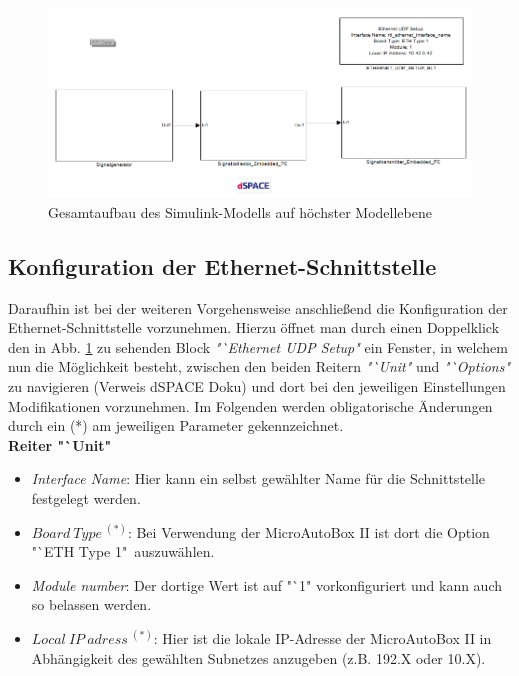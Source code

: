 \documentclass[fontsize = 12pt, paper = a4]{scrreprt}
\begin{document}
\begin{figure}[h]
\centering
\includegraphics[scale = 0.65]{topmodell}
\caption[Gesamtaufbau Simulink-Modell]{Gesamtaufbau des Simulink-Modells auf höchster Modellebene}
\label{topmodell}
\end{figure} 

\newpage


\subsection{Konfiguration der Ethernet-Schnittstelle}

Daraufhin ist bei der weiteren Vorgehensweise anschließend die Konfiguration der Ethernet-Schnittstelle vorzunehmen. Hierzu öffnet man durch einen Doppelklick den in Abb. \ref{topmodell} zu sehenden Block \textit{"`Ethernet UDP Setup"} ein Fenster, in welchem nun die Möglichkeit besteht, zwischen den beiden Reitern \textit{"`Unit"} und \textit{"`Options"} zu navigieren (Verweis dSPACE Doku) und dort bei den jeweiligen Einstellungen Modifikationen vorzunehmen. Im Folgenden werden obligatorische Änderungen durch ein (*) am jeweiligen Parameter gekennzeichnet. \\

\textbf{Reiter "`Unit"} 

\begin{itemize}

\item \textit{Interface Name}: Hier kann ein selbst gewählter Name für die Schnittstelle festgelegt werden.

\item \textit{$Board \ Type \ ^{(*)}$}: Bei Verwendung der MicroAutoBox II ist dort die Option \\ "`ETH Type 1"\ auszuwählen.

\item \textit{Module number}: Der dortige Wert ist auf "`1" vorkonfiguriert und kann auch so belassen werden.

\item \textit{$Local \ IP \ adress \ ^{(*)}$}: Hier ist die lokale IP-Adresse der MicroAutoBox II in Abhängigkeit des gewählten Subnetzes  anzugeben (z.B. 192.X oder 10.X).

\end{itemize}
\end{document}
